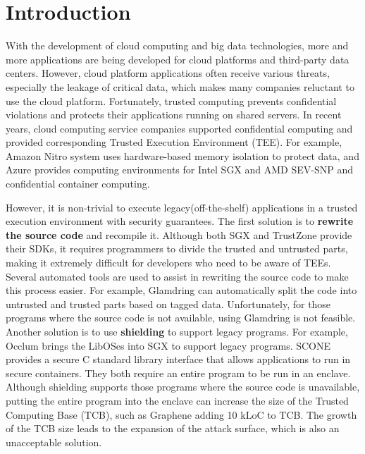 \section{Introduction}
With the development of cloud computing and big data technologies,
more and more applications are being developed for cloud platforms
and third-party data centers. However, cloud platform applications
often receive various threats, especially the leakage of critical data,
which makes many companies reluctant to use the cloud platform.
Fortunately, trusted computing prevents confidential violations and
protects their applications running on shared servers.
In recent years, cloud computing service companies supported confidential
computing and provided corresponding Trusted Execution Environment (TEE).
For example, Amazon Nitro system \cite{AmazonNitro} uses hardware-based memory
isolation to protect data, and Azure \cite{AzureDocs} provides computing environments
for Intel SGX and AMD SEV-SNP and confidential container computing.

However, it is non-trivial to execute legacy(off-the-shelf) applications
in a trusted execution environment with security guarantees.
The first solution is to \textbf{rewrite the source code} and recompile it.
Although both SGX and TrustZone provide their SDKs, it requires programmers
to divide the trusted and untrusted parts, making it extremely difficult for
developers who need to be aware of TEEs. Several automated tools are used to assist
in rewriting the source code to make this process easier.
For example, Glamdring \cite{Lind2017GlamdringAA} can automatically
split the code into untrusted and trusted parts based on tagged data.
Unfortunately, for those programs where the source code is not available,
using Glamdring is not feasible.
Another solution is to use \textbf{shielding} to support legacy programs.
For example, Occlum \cite{Shen2020OcclumSA} brings the LibOSes
into SGX to support legacy programs. SCONE \cite{Arnautov2016SCONESL}
provides a secure C standard library interface that allows applications to
run in secure containers. They both require an entire program to be run in an enclave.
Although shielding supports those programs where the source code is unavailable,
putting the entire program into the enclave can increase the size of the
Trusted Computing Base (TCB), such as Graphene \cite{Tsai2017GrapheneSGXAP}
adding 10 kLoC to TCB.
The growth of the TCB size leads to the expansion of the attack surface,
which is also an unacceptable solution.

